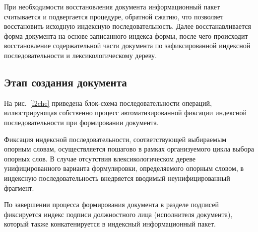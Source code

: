 \begin{multicols}{2}
     При необходимости восстановления документа информационный пакет 
считывается и подвергается процедуре, обратной сжатию, что позволяет 
восстановить исходную индексную последовательность. Далее 
восстанавливается форма документа на основе записанного индекса формы, 
после чего происходит восстановление содержательной части документа по 
зафиксированной индексной последовательности и лексикологическому дереву.
     
     \subsection*{Этап создания документа}
     
     На рис.~\ref{f2che} приведена блок-схема последовательности операций, 
иллюстрирующая собственно процесс автоматизированной фиксации 
индексной последовательности при формировании документа.
     
     Фиксация индексной последовательности, соответствующей выбираемым 
опорным словам, осуществляется пошагово в рамках организуемого цик\-ла 
выбора опорных слов. В случае отсутствия в\linebreak лексикологическом дереве 
унифицированного варианта формулировки, определяемого опорным словом, в 
индексную последовательность внедряется вводимый неунифицированный 
фрагмент.
     
     По завершении процесса формирования документа в разделе подписей 
фиксируется индекс подписи должностного лица (исполнителя документа), 
который также конкатенируется в индексный информационный пакет.
\end{multicols}

\begin{figure} %
\vspace*{1pt}
\begin{center}
\mbox{%
\epsfxsize=152.237mm
}
\end{center}
\vspace*{-9pt}
\vspace*{-6pt}
\end{figure}

